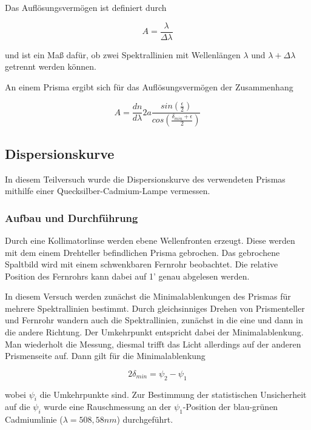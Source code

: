 \documentclass[12pt,a4paper]{article}
\begin{document}
Das Auflösungsvermögen ist definiert durch

\begin{equation}
A = \frac{\lambda}{\Delta \lambda}
\end{equation} 

und ist ein Maß dafür, ob zwei Spektrallinien mit Wellenlängen $\lambda$ und $\lambda + \Delta \lambda$ getrennt werden können.

An einem Prisma ergibt sich für das Auflösungsvermögen der Zusammenhang

\begin{equation}
A = \frac{dn}{d\lambda} 2a \frac{sin(\frac{\epsilon}{2})}{cos(\frac{\delta_{min}+\epsilon}{2})}
\end{equation}



\subsection{Dispersionskurve}
In diesem Teilversuch wurde die Dispersionskurve des verwendeten Prismas mithilfe einer Quecksilber-Cadmium-Lampe vermessen.

\subsubsection{Aufbau und Durchführung}
Durch eine Kollimatorlinse werden ebene Wellenfronten erzeugt. Diese werden mit dem einem Drehteller befindlichen Prisma gebrochen. Das gebrochene Spaltbild wird mit einem schwenkbaren Fernrohr beobachtet. Die relative Position des Fernrohrs kann dabei auf 1' genau abgelesen werden.

In diesem Versuch werden zunächst die Minimalablenkungen des Prismas für mehrere Spektrallinien bestimmt.
Durch gleichsinniges Drehen von Prismenteller und Fernrohr wandern auch die Spektrallinien, zunächst in die eine und dann in die andere Richtung. Der Umkehrpunkt entspricht dabei der Minimalablenkung. Man wiederholt die Messung, diesmal trifft das Licht allerdings auf der anderen Prismenseite auf. Dann gilt für die Minimalablenkung

\begin{equation}
2 \delta_{min} = \psi_2-\psi_1
\end{equation}

wobei $\psi_i$ die Umkehrpunkte sind.
Zur Bestimmung der statistischen Unsicherheit auf die $\psi_i$ wurde eine Rauschmessung an der $\psi_1$-Position der blau-grünen Cadmiumlinie ($\lambda=508,58nm$) durchgeführt.
\end{document}
